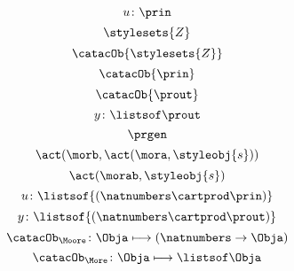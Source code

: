 {\begin{forslides}
\begin{equation}
        u\colon \prin
    \end{equation}
    \begin{equation}
        \label{eq:Z}
        \stylesets{Z}
    \end{equation}
    \begin{equation}
        \label{eq:Za}
        \catacOb{\stylesets{Z}}
    \end{equation}
    \begin{equation}
        \label{eq:Ua}
        \catacOb{\prin}
    \end{equation}
    \begin{equation}
        \label{eq:Ya}
        \catacOb{\prout}
    \end{equation}
    \begin{equation}
        \label{eq:prgen-y-2}
        y\colon \listsof  \prout
    \end{equation}
    \begin{equation}
        \label{eq:prgen}
        \prgen
    \end{equation}
    \begin{equation}
        \label{eq:now1}
        \act(\morb, \act(\mora, \styleobj{s}))
    \end{equation}
    \begin{equation}
        \label{eq:now2}
        \act(\morab, \styleobj{s})
    \end{equation}
    \begin{equation}
        \label{eq:ev-sign}
        u\colon \listsof{(\natnumbers \cartprod \prin)}
    \end{equation}
    \begin{equation}
        \label{eq:ev-sign2}
        y\colon \listsof{(\natnumbers \cartprod \prout)}
    \end{equation}
    \begin{equation}
        \label{eq:phi-moore}
        {\catacOb_{\Moore}}\colon{\Obja}\longmapsto{(\natnumbers \to \Obja)}
    \end{equation}
    \begin{equation}
        \label{eq:phi-more}
        {\catacOb_{\More}}\colon{\Obja}\longmapsto{\listsof \Obja}
    \end{equation}



\end{forslides}}
